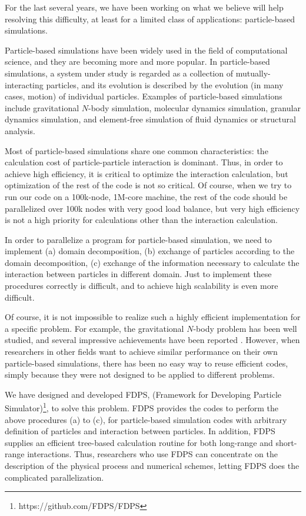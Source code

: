 \documentclass[dvipdfmx]{acm_proc_article-sp}
\begin{document}
For the last several years, we have been working on what we believe
will help resolving this difficulty, at least for a limited class of
applications: particle-based simulations.

Particle-based simulations have been widely used in the field of
computational science, and they are becoming more and more popular. In
particle-based simulations, a system under study is regarded as a
collection of mutually-interacting particles, and its evolution is
described by the evolution (in many cases, motion) of individual
particles. Examples of particle-based simulations include
gravitational $N$-body simulation, molecular dynamics simulation,
granular dynamics simulation, and element-free simulation of fluid
dynamics or structural analysis.

Most of particle-based simulations share one common characteristics:
the calculation cost of particle-particle interaction is
dominant. Thus, in order to achieve high efficiency, it is critical to
optimize the interaction calculation, but optimization of the rest of
the code is not so critical. Of course, when we try to run our code on
a 100k-node, 1M-core machine, the rest of the code should be
parallelized over 100k nodes with very good load balance, but very
high efficiency is not a high priority for calculations other than the
interaction calculation.

In order to parallelize a program for particle-based simulation, we
need to implement (a) domain decomposition, (b) exchange of particles
according to the domain decomposition, (c) exchange of the information
necessary to calculate the interaction between particles in different
domain. Just to implement these procedures correctly is difficult,
and to achieve high scalability is even more difficult.

Of course, it is not impossible to realize such a highly efficient
implementation for a specific problem. For example, the gravitational
$N$-body problem has been well studied, and several impressive
achievements have been reported {\cite{confscWarrenSBGSW97,
    2004PASJ...56..521M, 2005Natur.435..629S,
    Hamada:2009:THN:1654059.1654123, Hamada:2010:TAN:1884643.1884644,
    ishiyama:gordonbell, Bedorf:2014:PGT:2683593.2683600}}.  However,
when researchers in other fields want to achieve similar performance
on their own particle-based simulations, there has been no easy way to
reuse efficient codes, simply because they were not designed to be
applied to different problems.

We have designed and developed FDPS, (Framework for Developing
Particle Simulator)\footnote{https://github.com/FDPS/FDPS}, to solve
this problem. FDPS provides the codes to perform the above procedures
(a) to (c), for particle-based simulation codes with arbitrary
definition of particles and interaction between particles.  In
addition, FDPS supplies an efficient tree-based calculation routine
for both long-range and short-range interactions. Thus, researchers
who use FDPS can concentrate on the description of the physical
process and numerical schemes, letting FDPS does the complicated
parallelization.
\end{document}
